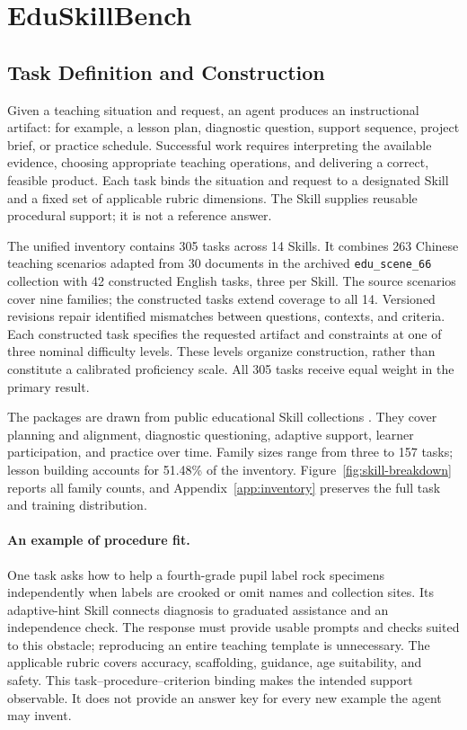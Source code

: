 \section{EduSkillBench}
\label{sec:benchmark}
\label{sec:framework}

\subsection{Task Definition and Construction}
Given a teaching situation and request, an agent produces an instructional
artifact: for example, a lesson plan, diagnostic question, support sequence,
project brief, or practice schedule. Successful work requires interpreting
the available evidence, choosing appropriate teaching operations, and
delivering a correct, feasible product. Each task binds the situation and
request to a designated Skill and a fixed set of applicable rubric dimensions.
The Skill supplies reusable procedural support; it is not a reference answer.

The unified inventory contains 305 tasks across 14 Skills. It combines 263
Chinese teaching scenarios adapted from 30 documents in the archived
\texttt{edu\_scene\_66} collection with 42 constructed English tasks, three
per Skill. The source scenarios cover nine families; the constructed tasks
extend coverage to all 14. Versioned revisions repair identified mismatches
between questions, contexts, and criteria. Each constructed task specifies
the requested artifact and constraints at one of three nominal difficulty
levels. These levels organize construction, rather than constitute a
calibrated proficiency scale. All 305 tasks receive equal weight in the
primary result.

The packages are drawn from public educational Skill collections
\citep{educationagentskills,teachingskills}. They cover planning and alignment,
diagnostic questioning, adaptive support, learner participation, and practice
over time. Family sizes range from three to 157 tasks; lesson building
accounts for 51.48\% of the inventory. Figure~\ref{fig:skill-breakdown} reports
all family counts, and Appendix~\ref{app:inventory} preserves the full task
and training distribution.

\paragraph{An example of procedure fit.}
One task asks how to help a fourth-grade pupil label rock specimens independently
when labels are crooked or omit names and collection sites. Its adaptive-hint
Skill connects diagnosis to graduated assistance and an independence check.
The response must provide usable prompts and checks suited to this obstacle;
reproducing an entire teaching template is unnecessary. The applicable rubric
covers accuracy, scaffolding, guidance, age suitability, and safety. This
task--procedure--criterion binding makes the intended support observable.
It does not provide an answer key for every new example the agent may invent.

